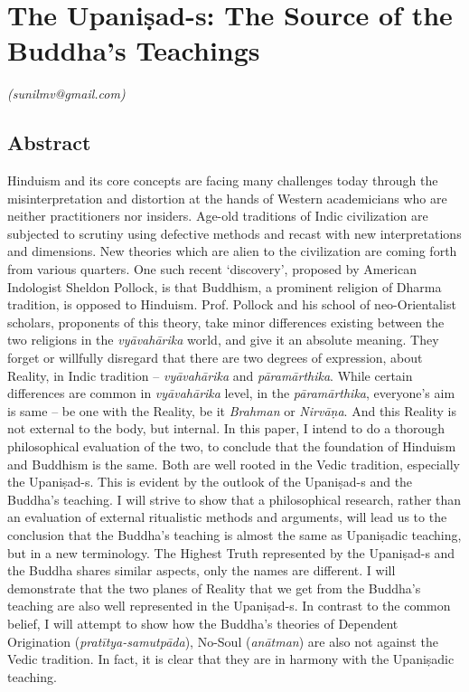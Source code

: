 
\chapter{The Upaniṣad-s: The Source of the Buddha’s Teachings}\label{chapter4}


\begin{flushright}
\textit{(sunilmv@gmail.com)}
\end{flushright}

\setcounter{endnote}{0}

\section*{Abstract}

Hinduism and its core concepts are facing many challenges today through the misinterpretation and distortion at the hands of Western academicians who are neither practitioners nor insiders. Age-old traditions of Indic civilization are subjected to scrutiny using defective methods and recast with new interpretations and dimensions. New theories which are alien to the civilization are coming forth from various quarters. One such recent ‘discovery’, proposed by American Indologist Sheldon Pollock, is that Buddhism, a prominent religion of Dharma tradition, is opposed to Hinduism. Prof. Pollock and his school of neo-Orientalist scholars, proponents of this theory, take minor differences existing between the two religions in the \textit{vyāvahārika} world, and give it an absolute meaning. They forget or willfully disregard that there are two degrees of expression, about Reality, in Indic tradition – \textit{vyāvahārika} and \textit{pāramārthika}. While certain differences are common in \textit{vyāvahārika} level, in the \textit{pāramārthika}, everyone’s aim is same – be one with the Reality, be it \textit{Brahman} or \textit{Nirvāṇa}. And this Reality is not external to the body, but internal. In this paper, I intend to do a thorough philosophical evaluation of the two, to conclude that the foundation of Hinduism and Buddhism is the same. Both are well rooted in the Vedic tradition, especially the Upaniṣad-s. This is evident by the outlook of the Upaniṣad-s and the Buddha’s teaching. I will strive to show that a philosophical research, rather than an evaluation of external ritualistic methods and arguments, will lead us to the conclusion that the Buddha’s teaching is almost the same as Upaniṣadic teaching, but in a new terminology. The Highest Truth represented by the Upaniṣad-s and the Buddha shares similar aspects, only the names are different. I will demonstrate that the two planes of Reality that we get from the Buddha’s teaching are also well represented in the Upaniṣad-s. In contrast to the common belief, I will attempt to show how the Buddha’s theories of Dependent Origination (\textit{pratītya-samutpāda}), No-Soul (\textit{anātman}) are also not against the Vedic tradition. In fact, it is clear that they are in harmony with the Upaniṣadic teaching.


